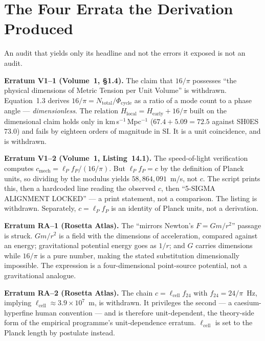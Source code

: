 \documentclass[11pt, letterpaper, openany]{book}
\begin{document}
\section{The Four Errata the Derivation Produced}

An audit that yields only its headline and not the errors it exposed is not an audit.

\begin{erratumbox}
\textbf{Erratum V1--1 (Volume~1, \S1.4).} The claim that $16/\pi$ possesses ``the physical
dimensions of Metric Tension per Unit Volume'' is withdrawn. Equation~1.3 derives
$16/\pi = N_{\mathrm{total}}/\Phi_{\mathrm{cycle}}$ as a ratio of a mode count to a phase angle ---
\emph{dimensionless}. The relation $H_{\mathrm{local}} = H_{\mathrm{early}} + 16/\pi$ built on the
dimensional claim holds only in km\,s$^{-1}$\,Mpc$^{-1}$ ($67.4 + 5.09 = 72.5$ against SH0ES $73.0$)
and fails by eighteen orders of magnitude in SI. It is a unit coincidence, and is withdrawn.
\end{erratumbox}

\begin{erratumbox}
\textbf{Erratum V1--2 (Volume~1, Listing~14.1).} The speed-of-light verification computes
$c_{\mathrm{mech}} = \ell_P f_P / (16/\pi)$. But $\ell_P f_P = c$ by the definition of Planck units,
so dividing by the modulus yields $58{,}864{,}091$~m/s, not $c$. The script prints this, then a
hardcoded line reading the observed $c$, then ``5-SIGMA ALIGNMENT LOCKED'' --- a print statement, not
a comparison. The listing is withdrawn. Separately, $c = \ell_P f_P$ is an identity of Planck units,
not a derivation.
\end{erratumbox}

\begin{erratumbox}
\textbf{Erratum RA--1 (Rosetta Atlas).} The ``mirrors Newton's $F = Gm/r^2$'' passage is struck.
$Gm/r^2$ is a field with the dimensions of acceleration, compared against an energy; gravitational
potential energy goes as $1/r$; and $G$ carries dimensions while $16/\pi$ is a pure number, making
the stated substitution dimensionally impossible. The expression is a four-dimensional point-source
potential, not a gravitational analogue.
\end{erratumbox}

\begin{erratumbox}
\textbf{Erratum RA--2 (Rosetta Atlas).} The chain $c = \ell_{\mathrm{cell}} f_{24}$ with
$f_{24} = 24/\pi$~Hz, implying $\ell_{\mathrm{cell}} \approx 3.9\times10^{7}$~m, is withdrawn. It
privileges the second --- a caesium-hyperfine human convention --- and is therefore unit-dependent,
the theory-side form of the empirical programme's unit-dependence erratum. $\ell_{\mathrm{cell}}$ is
set to the Planck length by postulate instead.
\end{erratumbox}
\end{document}
